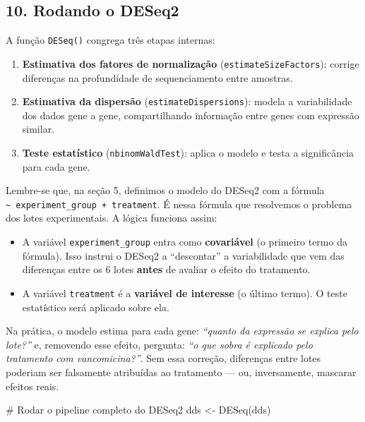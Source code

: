 \documentclass[
  letterpaper,
  DIV=11,
  numbers=noendperiod]{scrreprt}
\newenvironment{Shaded}{\begin{snugshade}}{\end{snugshade}}
\newcommand{\CommentTok}[1]{\textcolor[rgb]{0.37,0.37,0.37}{#1}}
\newcommand{\FunctionTok}[1]{\textcolor[rgb]{0.28,0.35,0.67}{#1}}
\newcommand{\NormalTok}[1]{\textcolor[rgb]{0.00,0.23,0.31}{#1}}
\newcommand{\OtherTok}[1]{\textcolor[rgb]{0.00,0.23,0.31}{#1}}
\providecommand{\tightlist}{%
  \setlength{\itemsep}{0pt}\setlength{\parskip}{0pt}}
\begin{document}
\subsection{10. Rodando o DESeq2}\label{rodando-o-deseq2}

A função \texttt{DESeq()} congrega três etapas internas:

\begin{enumerate}
\def\labelenumi{\arabic{enumi}.}
\tightlist
\item
  \textbf{Estimativa dos fatores de normalização}
  (\texttt{estimateSizeFactors}): corrige diferenças na profundidade de
  sequenciamento entre amostras.
\item
  \textbf{Estimativa da dispersão} (\texttt{estimateDispersions}):
  modela a variabilidade dos dados gene a gene, compartilhando
  informação entre genes com expressão similar.
\item
  \textbf{Teste estatístico} (\texttt{nbinomWaldTest}): aplica o modelo
  e testa a significância para cada gene.
\end{enumerate}

Lembre-se que, na seção 5, definimos o modelo do DESeq2 com a fórmula
\texttt{\textasciitilde{}\ experiment\_group\ +\ treatment}. É nessa
fórmula que resolvemos o problema dos lotes experimentais. A lógica
funciona assim:

\begin{itemize}
\tightlist
\item
  A variável \texttt{experiment\_group} entra como \textbf{covariável}
  (o primeiro termo da fórmula). Isso instrui o DESeq2 a ``descontar'' a
  variabilidade que vem das diferenças entre os 6 lotes \textbf{antes}
  de avaliar o efeito do tratamento.
\item
  A variável \texttt{treatment} é a \textbf{variável de interesse} (o
  último termo). O teste estatístico será aplicado sobre ela.
\end{itemize}

Na prática, o modelo estima para cada gene: \emph{``quanto da expressão
se explica pelo lote?''} e, removendo esse efeito, pergunta: \emph{``o
que sobra é explicado pelo tratamento com vancomicina?''}. Sem essa
correção, diferenças entre lotes poderiam ser falsamente atribuídas ao
tratamento --- ou, inversamente, mascarar efeitos reais.

\begin{Shaded}
\begin{Highlighting}[]
\CommentTok{\# Rodar o pipeline completo do DESeq2}
\NormalTok{dds }\OtherTok{\textless{}{-}} \FunctionTok{DESeq}\NormalTok{(dds)}
\end{Highlighting}
\end{Shaded}
\end{document}

